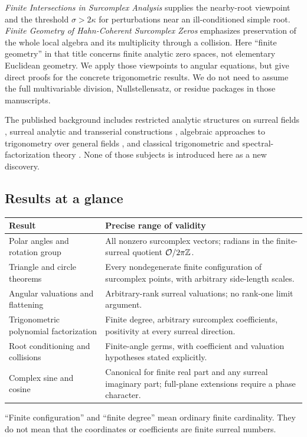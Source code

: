 \documentclass[11pt,letterpaper]{article}
\theoremstyle{definition}
\theoremstyle{remark}
\newcommand{\OO}{\mathcal O}\newcommand{\mm}{\mathfrak m}
\numberwithin{equation}{section}
\begin{document}
\emph{Finite Intersections in Surcomplex Analysis} \cite{SourceIntersections} supplies the nearby-root viewpoint and the threshold $\sigma>2\kappa$ for perturbations near an ill-conditioned simple root. \emph{Finite Geometry of Hahn-Coherent Surcomplex Zeros} \cite{SourceGeometry} emphasizes preservation of the whole local algebra and its multiplicity through a collision. Here ``finite geometry'' in that title concerns finite analytic zero spaces, not elementary Euclidean geometry. We apply those viewpoints to angular equations, but give direct proofs for the concrete trigonometric results. We do not need to assume the full multivariable division, Nullstellensatz, or residue packages in those manuscripts.

The published background includes restricted analytic structures on surreal fields \cite{vdDE}, surreal analytic and transserial constructions \cite{Alling,BM,CE}, algebraic approaches to trigonometry over general fields \cite{Wildberger,Gunn}, and classical trigonometric and spectral-factorization theory \cite{DLMF,DR}. None of those subjects is introduced here as a new discovery.

\subsection{Results at a glance}
\begin{center}\small
\begin{tabular}{@{}L{0.29\textwidth}L{0.58\textwidth}@{}}
\toprule
Result & Precise range of validity\\
\midrule
Polar angles and rotation group & All nonzero surcomplex vectors; radians in the finite-surreal quotient $\OO/2\pi\Z$.\\[0.35em]
Triangle and circle theorems & Every nondegenerate finite configuration of surcomplex points, with arbitrary side-length scales.\\[0.35em]
Angular valuations and flattening & Arbitrary-rank surreal valuations; no rank-one limit argument.\\[0.35em]
Trigonometric polynomial factorization & Finite degree, arbitrary surcomplex coefficients, positivity at every surreal direction.\\[0.35em]
Root conditioning and collisions & Finite-angle germs, with coefficient and valuation hypotheses stated explicitly.\\[0.35em]
Complex sine and cosine & Canonical for finite real part and any surreal imaginary part; full-plane extensions require a phase character.\\
\bottomrule
\end{tabular}
\end{center}
``Finite configuration'' and ``finite degree'' mean ordinary finite cardinality. They do not mean that the coordinates or coefficients are finite surreal numbers.
\end{document}
